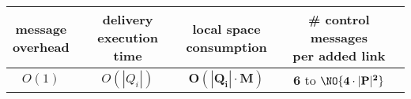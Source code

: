 


\begin{tabularx}{0.90\columnwidth}{@{}cccc@{}}
  \makecell{message\\overhead} &  \makecell{delivery\\execution time} & \makecell{local space\\consumption} & \makecell{\# control messages\\per added link} \\ \hline
  $O(1)$ & $O(|Q_i|)$ & $\mathbf{O(|Q_i|\cdot M)}$ & $\mathbf{6}$ to $\NO{\mathbf{4\cdot |P|^2}}$ \\
\end{tabularx}

